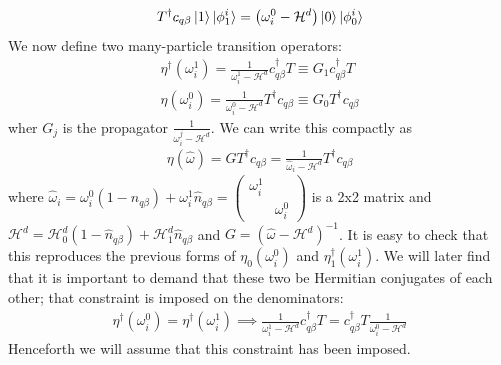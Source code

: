 \begin{equation}\begin{aligned}
	\label{changeb}
	T^\dagger c_{q\beta}\ket{1}\ket{\phi_1^i} = \left(\omega_i^0 - \mathcal{H}^d\right)\ket{0}\ket{\phi_0^i}
\end{aligned}\end{equation}
We now define two many-particle transition operators:
\begin{equation}\begin{aligned}
	\label{etadefine}
{\eta}^\dagger(\omega_i^1) = \frac{1}{\omega_i^1- \mathcal{H}^d}c^\dagger_{q\beta}T \equiv G_1 c^\dagger_{q\beta}T\\
\eta(\omega_i^0) = \frac{1}{\omega_i^0- \mathcal{H}^d}T^\dagger c_{q\beta} \equiv G_0 T^\dagger c_{q\beta}
\end{aligned}\end{equation}
wher \(G_j\) is the propagator \(\frac{1}{\omega_i^j- \mathcal{H}^d}\). We can write this compactly as
\begin{equation}\begin{aligned}
	\label{etadagdef}
\eta(\hat \omega) = GT^\dagger c_{q\beta} = \frac{1}{\hat \omega_i- \mathcal{H}^d}T^\dagger c_{q\beta}
\end{aligned}\end{equation}
where \(\hat \omega_i = \omega_i^0\left(1 - \hat n_{q\beta}\right) + \omega_i^1\hat n_{q\beta} = \begin{pmatrix} \omega_i^1 & \\ & \omega_i^0 \end{pmatrix}\) is a 2x2 matrix and \(\mathcal{H}^d = \mathcal{H}^d_0\left(1 - \hat n_{q\beta}\right) + \mathcal{H}^d_1\hat n_{q\beta}\) and \(G = \left(\hat \omega - \mathcal{H}^d\right)^{-1}\). It is easy to check that this reproduces the previous forms of \(\eta_0(\omega^0_i)\) and \(\eta_1^\dagger(\omega^1_i)\).
We will later find that it is important to demand that these two be Hermitian conjugates of each other; that constraint is imposed on the denominators:
\begin{equation}\begin{aligned}
	\label{constraint}
\eta^\dagger(\omega_i^0) = \eta^\dagger(\omega_i^1) \implies \frac{1}{\omega_i^1- \mathcal{H}^d}c^\dagger_{q\beta}T = c^\dagger_{q\beta}T\frac{1}{\omega_i^0- \mathcal{H}^d}
\end{aligned}\end{equation}
Henceforth we will assume that this constraint has been imposed. 

